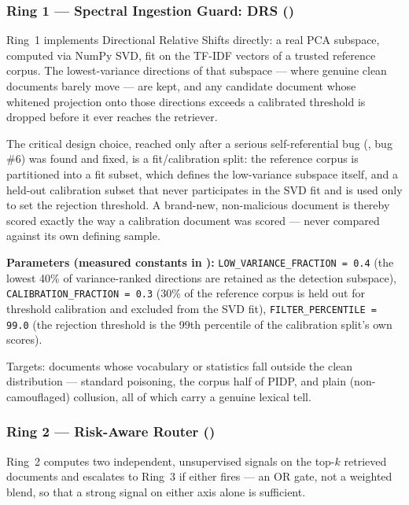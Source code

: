 \subsubsection{Ring 1 --- Spectral Ingestion Guard: DRS ()}

Ring~1 implements Directional Relative Shifts directly: a real PCA
subspace, computed via NumPy SVD, fit on the TF-IDF vectors of a trusted
reference corpus. The lowest-variance directions of that subspace ---
where genuine clean documents barely move --- are kept, and any candidate
document whose whitened projection onto those directions exceeds a
calibrated threshold is dropped before it ever reaches the retriever.

The critical design choice, reached only after a serious self-referential
bug (, bug \#6) was found and fixed, is a
fit/calibration split: the reference corpus is partitioned into a fit
subset, which defines the low-variance subspace itself, and a held-out
calibration subset that never participates in the SVD fit and is used
only to set the rejection threshold. A brand-new, non-malicious document
is thereby scored exactly the way a calibration document was scored ---
never compared against its own defining sample.

\textbf{Parameters (measured constants in ):}
\texttt{LOW\_VARIANCE\_FRACTION = 0.4} (the lowest 40\% of variance-ranked
directions are retained as the detection subspace), \texttt{CALIBRATION\_FRACTION
= 0.3} (30\% of the reference corpus is held out for threshold
calibration and excluded from the SVD fit), \texttt{FILTER\_PERCENTILE =
99.0} (the rejection threshold is the 99th percentile of the calibration
split's own scores).

Targets: documents whose vocabulary or statistics fall outside the clean
distribution --- standard poisoning, the corpus half of PIDP, and plain
(non-camouflaged) collusion, all of which carry a genuine lexical tell.

\subsubsection{Ring 2 --- Risk-Aware Router ()}
\label{sec:ring2}

Ring~2 computes two independent, unsupervised signals on the top-$k$
retrieved documents and escalates to Ring~3 if either fires --- an OR
gate, not a weighted blend, so that a strong signal on either axis alone
is sufficient.

